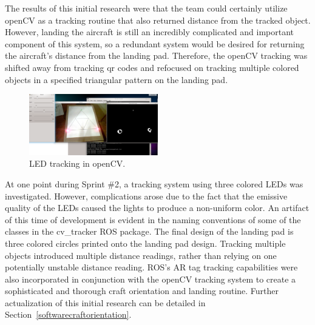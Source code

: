 The results of this initial research were that the team could certainly utilize openCV as a tracking routine that also returned distance from the tracked object. However, landing the aircraft is still an incredibly complicated and important component of this system, so a redundant system would be desired for returning the aircraft's distance from the landing pad. Therefore, the openCV tracking was shifted away from tracking qr codes and refocused on tracking multiple colored objects in a specified triangular pattern on the landing pad. 


\begin{figure}[!h]
\begin{center}
\includegraphics[width=0.5\textwidth]{resources/img/ledtracking01}
\end{center}
\caption{LED tracking in openCV.\label{ledtracking}}
\end{figure}

At one point during Sprint \#2, a tracking system using three colored LEDs was investigated. However, complications arose due to the fact that the emissive quality of the LEDs caused the lights to produce a non-uniform color. An artifact of this time of development is evident in the naming conventions of some of the classes in the cv\_tracker ROS package. The final design of the landing pad is three colored circles printed onto the landing pad design. Tracking multiple objects introduced multiple distance readings, rather than relying on one potentially unstable distance reading. ROS's AR tag tracking capabilities were also incorporated in conjunction with the openCV tracking system to create a sophisticated and thorough craft orientation and landing routine. Further actualization of this initial research can be detailed in Section~\ref{softwarecraftorientation}.









